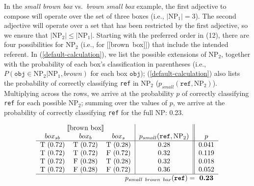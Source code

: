 \documentclass[preprint,authoryear]{elsarticle}\frenchspacing
\newcommand{\sem}[1]{\mbox{$[\![$#1$]\!]$}}
\begin{document}
%

In the \emph{small brown box} vs.~\emph{brown small box} example, the first adjective to compose will operate over the set of three boxes (i.e., $|\textrm{NP}_1| = 3$). The second adjective will operate over a set that has been restricted by the first adjective, so we ensure that $|\textrm{NP}_2| \leq |\textrm{NP}_1|$. Starting with the preferred order in (12), there are four possibilities for NP$_2$ (i.e., for \sem{brown box}) that include the intended referent. In (\ref{default-calculation}), we list the possible extensions of NP$_2$, together with the probability of each box's classification in parentheses (i.e., $P(\texttt{obj} \in \textrm{NP}_2 | \textrm{NP}_1, brown)$ for each box $\texttt{obj}$); (\ref{default-calculation}) also lists %
the probability of correctly classifying \texttt{ref} in NP$_2$ ($p_{small}(\texttt{ref}, \textrm{NP}_2)$). Multiplying across the rows, we arrive at the probability $p$ of correctly classifying \texttt{ref} for each possible NP$_2$; summing over the values of $p$, we arrive at the probability of correctly classifying \texttt{ref} for the full NP: 0.23.

\begin{equation}
\label{default-calculation}
\begin{tabular}{ccc|c||c}	
	\multicolumn{3}{c|}{\sem{brown box}} & & \\
	$box_{sb}$ & $box_b$ & $box_s$ & $p_{small}(\texttt{ref}, \textrm{NP}_2)$ & $p$\\ \hline
	T (0.72) & T (0.72) & T (0.28) & 0.28 & 0.041 \\
	T (0.72) & T (0.72) & F (0.72) & 0.32 & 0.119 \\
	T (0.72) & F (0.28) & T (0.28) & 0.32 & 0.018 \\
	T (0.72) & F (0.28) & F (0.72) & 0.36 & 0.052 \\ \hline
	\multicolumn{4}{r}{\textbf{$p_{{small\ brown\ box}}(\texttt{ref}) = $}}\hspace{-10pt} & \textbf{0.23} \\ 
	\end{tabular}
	\end{equation}
	
\end{document}
